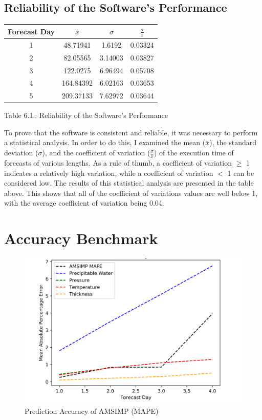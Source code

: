 \subsection{Reliability of the Software's Performance}\label{stats}
\begin{center}
\begin{tabular}{|c|c|c|c|} 
 \hline
 Forecast Day & $\bar{x}$ & $\sigma$ & $\frac{\sigma}{\bar{x}}$ \\
 \hline
 1 & 48.71941 & 1.6192 & 0.03324 \\
 \hline
 2 & 82.05565 & 3.14003 & 0.03827 \\
 \hline
 3 & 122.0275 & 6.96494 & 0.05708 \\
 \hline
 4 & 164.84392 & 6.02163 & 0.03653 \\
 \hline
 5 & 209.37133 & 7.62972 & 0.03644 \\
 \hline
\end{tabular}\par
\bigskip
Table 6.1.: Reliability of the Software's Performance
\end{center}

To prove that the software is consistent and reliable, it was necessary to perform a statistical analysis. In order to do this, I examined the mean ($\bar{x}$), the standard deviation ($\sigma$), and the coefficient of variation ($\frac{\sigma}{\bar{x}}$) of the execution time of forecasts of various lengths. As a rule of thumb, a coefficient of variation $\geq$ 1 indicates a relatively high variation, while a coefficient of variation $<$ 1 can be considered low. The results of this statistical analysis are presented in the table above. This shows that all of the coefficient of variations values are well below 1, with the average coefficient of variation being 0.04.

\section{Accuracy Benchmark}
\begin{figure}[H]
    \centering
    \includegraphics[width=.8\linewidth]{Graphs/mape_graph.png}
    \caption{Prediction Accuracy of AMSIMP (MAPE)}
    \label{mape_accuracy}
\end{figure}

